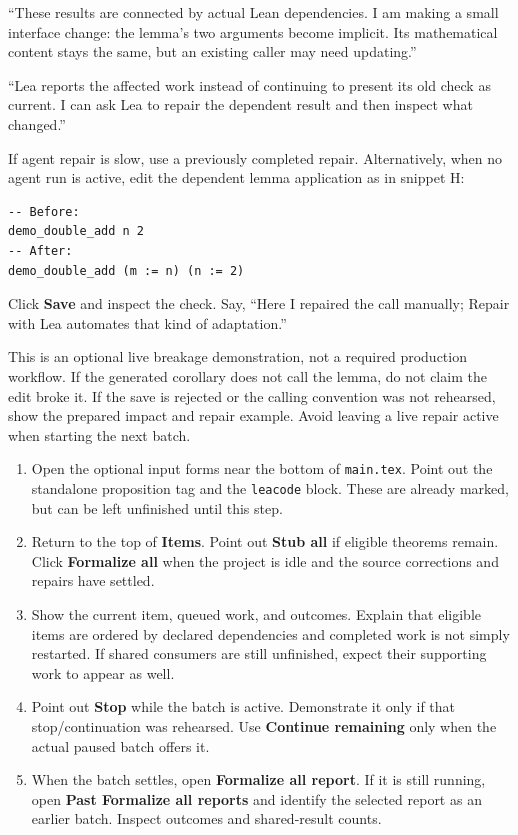 \say
``These results are connected by actual Lean dependencies. I am making a
small interface change: the lemma's two arguments become implicit. Its
mathematical content stays the same, but an existing caller may need updating.''

``Lea reports the affected work instead of continuing to present its old
check as current. I can ask Lea to repair the dependent result and then
inspect what changed.''

If agent repair is slow, use a previously completed repair. Alternatively,
when no agent run is active, edit the dependent lemma application as in snippet H:
\begin{lstlisting}
-- Before:
demo_double_add n 2
-- After:
demo_double_add (m := n) (n := 2)
\end{lstlisting}
Click \textbf{Save} and inspect the check. Say, ``Here I repaired the call
manually; Repair with Lea automates that kind of adaptation.''

\fallback
This is an optional live breakage demonstration, not a required production
workflow. If the generated corollary does not call the lemma, do not claim the
edit broke it. If the save is rejected or the calling convention was not
rehearsed, show the prepared impact and repair example. Avoid leaving a live
repair active when starting the next batch.

\clearpage
{}

\click
\begin{enumerate}
  \item Open the optional input forms near the bottom of \texttt{main.tex}.
    Point out the standalone proposition tag and the \texttt{leacode} block.
    These are already marked, but can be left unfinished until this step.
  \item Return to the top of \textbf{Items}. Point out \textbf{Stub all} if
    eligible theorems remain. Click \textbf{Formalize all} when the project is
    idle and the source corrections and repairs have settled.
  \item Show the current item, queued work, and outcomes. Explain that eligible
    items are ordered by declared dependencies and completed work is not simply
    restarted. If shared consumers are still unfinished, expect their supporting
    work to appear as well.
  \item Point out \textbf{Stop} while the batch is active. Demonstrate it only
    if that stop/continuation was rehearsed. Use \textbf{Continue remaining} only
    when the actual paused batch offers it.
  \item When the batch settles, open \textbf{Formalize all report}. If it is
    still running, open \textbf{Past Formalize all reports} and identify the
    selected report as an earlier batch. Inspect outcomes and shared-result counts.
\end{enumerate}

